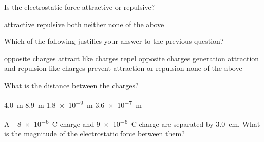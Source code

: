 \documentclass[]{exam}
\begin{document}
\begin{questions}
\begin{center}
\end{center}

\question \label{yETfik}
Is the electrostatic force attractive or repulsive?

\begin{randomizechoices}[keeplast]
    \correctchoice attractive
    \choice repulsive
    \choice both
    \choice neither
    \choice none of the above
\end{randomizechoices}

\question
Which of the following justifies your answer to the previous question?

\begin{randomizechoices}[keeplast]
    \correctchoice opposite charges attract
    \choice like charges repel
    \choice opposite charges generation attraction and repulsion
    \choice like charges prevent attraction or repulsion
    \choice none of the above
\end{randomizechoices}

\question \label{b4zyju}
What is the distance between the charges?

\begin{randomizechoices}
    \correctchoice \SI{4.0}{m}
    \choice \SI{8.9}{m}
    \choice \SI{1.8e-9}{m}
    \choice \SI{3.6e-7}{m}
\end{randomizechoices}
\vspace{1em}



\question
A \SI{-8e-6}{C} charge and \SI{9e-6}{C} charge are separated by \SI{3.0}{cm}. What is the magnitude of the electrostatic force between them?


\end{questions}
\end{document}
